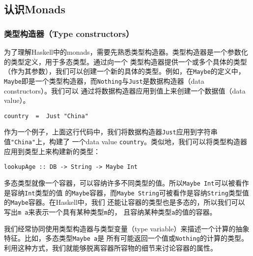 \subsection{认识Monads}
\subsubsection{类型构造器（Type constructors）}
为了理解Haskell中的monads，需要先熟悉类型构造器。类型构造器是一个参数化的类型定义，用于多态类型。通过向一个
类型构造器提供一个或多个具体的类型（作为其参数），我们可以创建一个新的具体的类型。例如，在\texttt{Maybe}的定义中，
\texttt{Maybe}即是一个类型构造器，而\texttt{Nothing}与\texttt{Just}是数据构造器（data constructors）。我们可以
通过将数据构造器应用到值上来创建一个数据值（data value）。
\begin{verbatim}
country  =  Just "China"
\end{verbatim}
\noindent{}作为一个例子，上面这行代码中，我们将数据构造器\texttt{Just}应用到字符串值\texttt{"China"}上，构建了
一个data value \texttt{country}。类似地，我们可以将类型构造器应用到类型上来构建新的类型：
\begin{verbatim}
lookupAge :: DB -> String -> Maybe Int
\end{verbatim}
\indent{}多态类型就像一个容器，可以容纳许多不同类型的值。所以\texttt{Maybe Int}可以被看作是容纳\texttt{Int}类型的值
的\texttt{Maybe}容器，而\texttt{Maybe String}可被看作是容纳\texttt{String}类型值的\texttt{Maybe}容器。在Haskell中，我们
还能让容器的类型也是多态的，所以我们可以写出\texttt{m a}来表示一个具有某种类型\texttt{m}的，
且容纳某种类型\texttt{a}的值的容器。

\indent{}我们经常协同使用类型构造器与类型变量（type variable）来描述一个计算的抽象特征。比如，多态类型\texttt{Maybe a}是
所有可能返回一个值或\texttt{Nothing}的计算的类型。利用这种方式，我们就能够脱离容器所容物的细节来讨论容器的属性。

